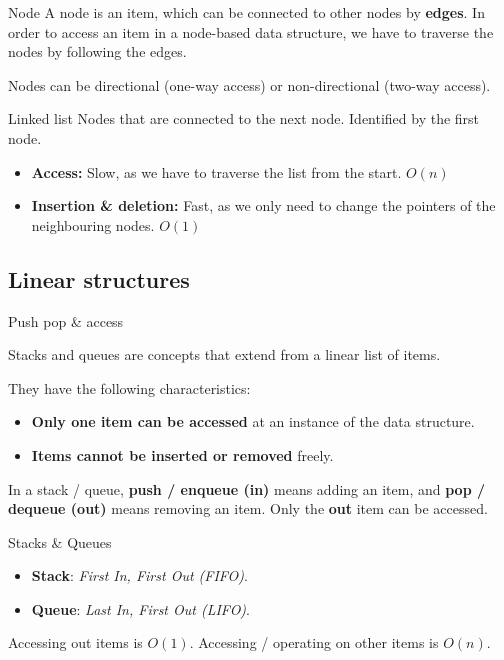 \begin{knBox}
    {Node}
    A node is an item, which can be connected to other nodes by \textbf{edges}. In order to access an item in a node-based data structure, we have to traverse the nodes by following the edges.

    Nodes can be directional (one-way access) or non-directional (two-way access).
\end{knBox}

\begin{definition}
    {Linked list}
    Nodes that are connected to the next node. Identified by the first node.
    \begin{itemize}
        \item \textbf{Access:} Slow, as we have to traverse the list from the start. $O(n)$
        \item \textbf{Insertion \& deletion:} Fast, as we only need to change the pointers of the neighbouring nodes. $O(1)$
    \end{itemize}
\end{definition}

\subsection{Linear structures}
\label{subsec:linear-structures}

\begin{definition}
    {Push pop \& access}

    Stacks and queues are concepts that extend from a linear list of items.

    They have the following characteristics:
    \begin{itemize}
        \item \textbf{Only one item can be accessed} at an instance of the data structure.
        \item \textbf{Items cannot be inserted or removed} freely.
    \end{itemize}

    In a stack / queue, \textbf{push / enqueue (in)} means adding an item, and \textbf{pop / dequeue (out)} means removing an item. Only the \textbf{out} item can be accessed.
\end{definition}

\begin{definition}
    {Stacks \& Queues}
    \begin{itemize}
        \item \textbf{Stack}: \textit{First In, First Out (FIFO)}.
        \item \textbf{Queue}: \textit{Last In, First Out (LIFO)}.
    \end{itemize}
    Accessing out items is $O(1)$. Accessing / operating on other items is $O(n)$.
\end{definition}

